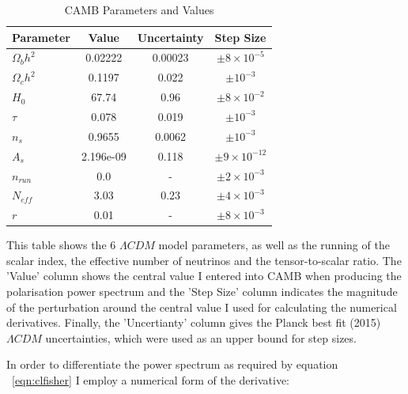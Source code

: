 \begin{table}[h]
\centering
\caption{CAMB Parameters and Values}
\label{table:camb}
\begin{tabular}{l|l|l|l}
Parameter & \multicolumn{1}{c|}{Value} & Uncertainty & Step Size \\ \hline
$\Omega_{b}h^{2}$ & \multicolumn{1}{c|}{0.02222} & \multicolumn{1}{c|}{0.00023} & \multicolumn{1}{c}{$\pm 8 \times 10^{-5}$}  \\
$\Omega_{c}h^{2}$ & \multicolumn{1}{c|}{0.1197} & \multicolumn{1}{c|}{0.022} & \multicolumn{1}{c}{$\pm 10^{-3}$}  \\
$H_0$ & \multicolumn{1}{c|}{67.74} & \multicolumn{1}{c|}{0.96} & \multicolumn{1}{c}{$\pm 8 \times 10^{-2}$}  \\
$\tau$ & \multicolumn{1}{c|}{0.078} & \multicolumn{1}{c|}{0.019} & \multicolumn{1}{c}{$\pm 10^{-3}$}  \\
$n_s$ & \multicolumn{1}{c|}{0.9655} & \multicolumn{1}{c|}{0.0062} & \multicolumn{1}{c}{$\pm 10^{-3}$}  \\
$A_s$ & \multicolumn{1}{c|}{2.196e-09} & \multicolumn{1}{c|}{0.118} & \multicolumn{1}{c}{$\pm 9 \times 10^{-12}$}  \\
$n_{run}$ & \multicolumn{1}{c|}{0.0} & \multicolumn{1}{c|}{-} & \multicolumn{1}{c}{$\pm 2 \times 10^{-3}$}  \\
$N_{eff}$ & \multicolumn{1}{c|}{3.03} & \multicolumn{1}{c|}{0.23} & \multicolumn{1}{c}{$\pm 4 \times 10^{-3}$}  \\
$r$ & \multicolumn{1}{c|}{0.01} & \multicolumn{1}{c|}{-} & \multicolumn{1}{c}{$\pm 8 \times 10^{-3}$} 
\end{tabular}

\bigskip
\begin{flushleft}
This table shows the 6 $\Lambda CDM$ model parameters, as well as the running of the scalar index, the effective number of neutrinos and the tensor-to-scalar ratio. The 'Value' column shows the central value I entered into CAMB when producing the polarisation power spectrum and the 'Step Size' column indicates the magnitude of the perturbation around the central value I used for calculating the numerical derivatives. Finally, the 'Uncertianty' column gives the Planck best fit (2015) \cite{Ade:2015xua} $\Lambda CDM$ uncertainties, which were used as an upper bound for step sizes.
\end{flushleft}
\end{table}

\pagebreak 

In order to differentiate the power spectrum as required by equation ~\ref{eqn:clfisher} I employ a numerical form of the derivative:

